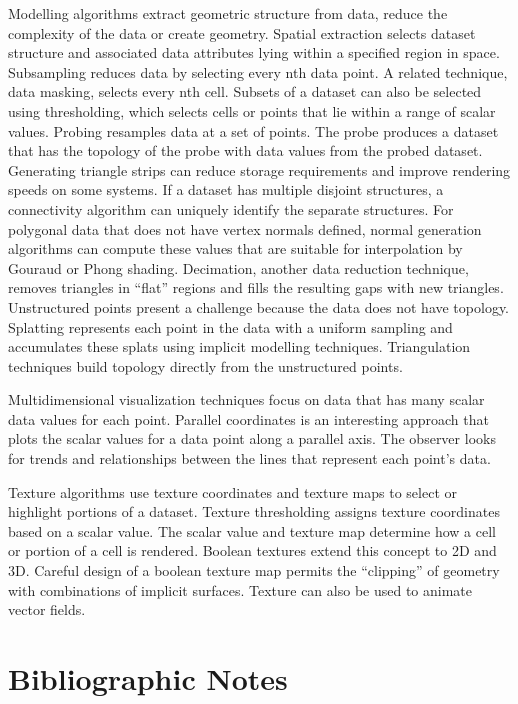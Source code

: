 Modelling algorithms extract geometric structure from data, reduce the complexity of the data or create geometry. Spatial extraction selects dataset structure and associated data attributes lying within a specified region in space. Subsampling reduces data by selecting every nth data point. A related technique, data masking, selects every nth cell. Subsets of a dataset can also be selected using thresholding, which selects cells or points that lie within a range of scalar values. Probing resamples data at a set of points. The probe produces a dataset that has the topology of the probe with data values from the probed dataset. Generating triangle strips can reduce storage requirements and improve rendering speeds on some systems. If a dataset has multiple disjoint structures, a connectivity algorithm can uniquely identify the separate structures. For polygonal data that does not have vertex normals defined, normal generation algorithms can compute these values that are suitable for interpolation by Gouraud or Phong shading. Decimation, another data reduction technique, removes triangles in ``flat'' regions and fills the resulting gaps with new triangles. Unstructured points present a challenge because the data does not have topology. Splatting represents each point in the data with a uniform sampling and accumulates these splats using implicit modelling techniques. Triangulation techniques build topology directly from the unstructured points.

Multidimensional visualization techniques focus on data that has many scalar data values for each point. Parallel coordinates is an interesting approach that plots the scalar values for a data point along a parallel axis. The observer looks for trends and relationships between the lines that represent each point's data.

Texture algorithms use texture coordinates and texture maps to select or highlight portions of a dataset. Texture thresholding assigns texture coordinates based on a scalar value. The scalar value and texture map determine how a cell or portion of a cell is rendered. Boolean textures extend this concept to 2D and 3D. Careful design of a boolean texture map permits the ``clipping'' of geometry with combinations of implicit surfaces. Texture can also be used to animate vector fields.

\section{Bibliographic Notes}
\label{sec:bibliographic_notes.ch09}

